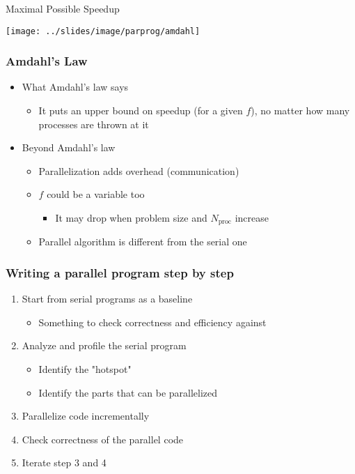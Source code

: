 \documentclass[10pt,t]{beamer}
\begin{document}
\begin{frame}{Maximal Possible Speedup}
  \begin{center}
    \texttt{[image: ../slides/image/parprog/amdahl]}
  \end{center}
\end{frame}

\begin{frame}
  \frametitle{Amdahl's Law}
  \begin{itemize}
  \item What Amdahl's law says
    \begin{itemize}
    \item It puts an upper bound on speedup (for a given $f$), no matter how many processes are thrown at it
    \end{itemize}
  \item Beyond Amdahl's law
    \begin{itemize}
    \item Parallelization adds overhead (communication)
    \item $f$ could be a variable too
      \begin{itemize}
      \item It may drop when problem size and $N_\mathrm{proc}$ increase
      \end{itemize}
    \item Parallel algorithm is different from the serial one
    \end{itemize}
  \end{itemize}
\end{frame}

\begin{frame}
  \frametitle{Writing a parallel program step by step}
  \begin{enumerate}
  \item Start from serial programs as a baseline
    \begin{itemize}
    \item Something to check correctness and efficiency against
    \end{itemize}
  \item Analyze and profile the serial program
    \begin{itemize}
    \item Identify the "hotspot"
    \item Identify the parts that can be parallelized
    \end{itemize}
  \item Parallelize code incrementally
  \item Check correctness of the parallel code
  \item Iterate step 3 and 4
  \end{enumerate}
\end{frame}
\end{document}
